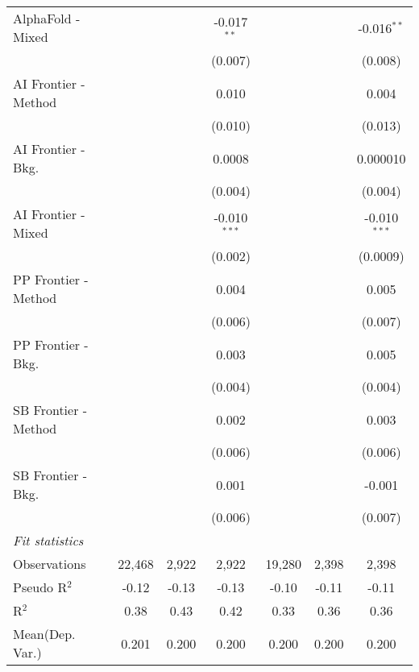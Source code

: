 \begin{tabular}{lcccccc}
   AlphaFold - Mixed    &               &              & -0.017$^{**}$  &               &              & -0.016$^{**}$\\   
                        &               &              & (0.007)        &               &              & (0.008)\\   
   AI Frontier - Method &               &              & 0.010          &               &              & 0.004\\   
                        &               &              & (0.010)        &               &              & (0.013)\\   
   AI Frontier - Bkg.   &               &              & 0.0008         &               &              & 0.000010\\   
                        &               &              & (0.004)        &               &              & (0.004)\\   
   AI Frontier - Mixed  &               &              & -0.010$^{***}$ &               &              & -0.010$^{***}$\\   
                        &               &              & (0.002)        &               &              & (0.0009)\\   
   PP Frontier - Method &               &              & 0.004          &               &              & 0.005\\   
                        &               &              & (0.006)        &               &              & (0.007)\\   
   PP Frontier - Bkg.   &               &              & 0.003          &               &              & 0.005\\   
                        &               &              & (0.004)        &               &              & (0.004)\\   
   SB Frontier - Method &               &              & 0.002          &               &              & 0.003\\   
                        &               &              & (0.006)        &               &              & (0.006)\\   
   SB Frontier - Bkg.   &               &              & 0.001          &               &              & -0.001\\   
                        &               &              & (0.006)        &               &              & (0.007)\\   
   \midrule
   \emph{Fit statistics}\\
   Observations         & 22,468        & 2,922        & 2,922          & 19,280        & 2,398        & 2,398\\  
   Pseudo R$^2$         & -0.12         & -0.13        & -0.13          & -0.10         & -0.11        & -0.11\\  
   R$^2$                & 0.38          & 0.43         & 0.42           & 0.33          & 0.36         & 0.36\\  
Mean(Dep. Var.) & 0.201 & 0.200 & 0.200 & 0.200 & 0.200 & 0.200 \\
   

\end{tabular}
